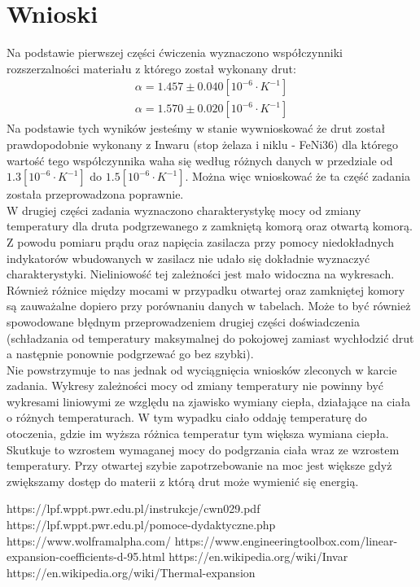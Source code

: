 \documentclass[11pt]{article}
\begin{document}
    \section{Wnioski}
    Na podstawie pierwszej części ćwiczenia wyznaczono współczynniki rozszerzalności materiału z którego został wykonany drut:
    \begin{gather*}
        \alpha=1.457\pm 0.040 [10^{-6}\cdot K^{-1}]\\
        \alpha=1.570\pm 0.020[10^{-6}\cdot K^{-1}]
    \end{gather*}
    \indent Na podstawie tych wyników jesteśmy w stanie wywnioskować że drut został prawdopodobnie wykonany z Inwaru (stop żelaza i niklu - FeNi36)
    dla którego wartość tego współczynnika waha się według różnych danych w przedziale od $1.3[10^{-6}\cdot K^{-1}]$ do $1.5[10^{-6}\cdot K^{-1}]$.
    Można więc wnioskować że ta część zadania została przeprowadzona poprawnie.\\

    W drugiej części zadania wyznaczono charakterystykę mocy od zmiany temperatury dla druta podgrzewanego z zamkniętą komorą oraz otwartą komorą.
    Z powodu pomiaru prądu oraz napięcia zasilacza przy pomocy niedokładnych indykatorów wbudowanych w zasilacz nie udało się dokładnie wyznaczyć
    charakterystyki. Nieliniowość tej zależności jest mało widoczna na wykresach. Również różnice między mocami w przypadku otwartej oraz zamkniętej komory
    są zauważalne dopiero przy porównaniu danych w tabelach. Może to być również spowodowane błędnym przeprowadzeniem drugiej części doświadczenia
    (schładzania od temperatury maksymalnej do pokojowej zamiast wychłodzić drut a następnie ponownie podgrzewać go bez szybki).\\
    \indent Nie powstrzymuje to nas jednak od wyciągnięcia wniosków zleconych w karcie zadania. Wykresy zależności mocy od zmiany temperatury
    nie powinny być wykresami liniowymi ze względu na zjawisko wymiany ciepła, działające na ciała o różnych temperaturach. W tym wypadku ciało
    oddaję temperaturę do otoczenia, gdzie im wyższa różnica temperatur tym większa wymiana ciepła. Skutkuje to wzrostem wymaganej mocy do podgrzania ciała
    wraz ze wzrostem temperatury. Przy otwartej szybie zapotrzebowanie na moc jest większe gdyż zwiększamy dostęp do materii z którą drut może wymienić
    się energią.

    \vfill
    \footnotesize
    \begin{thebibliography}{9}
        https://lpf.wppt.pwr.edu.pl/instrukcje/cwn029.pdf
        https://lpf.wppt.pwr.edu.pl/pomoce-dydaktyczne.php
        https://www.wolframalpha.com/
        https://www.engineeringtoolbox.com/linear-expansion-coefficients-d-95.html
        https://en.wikipedia.org/wiki/Invar
        https://en.wikipedia.org/wiki/Thermal-expansion
    \end{thebibliography}
\end{document}
